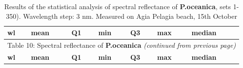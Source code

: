 \documentclass[10pt, a4paper]{article}
\begin{document}
\begin{appendices}
\begin{longtable}{|c|c|c|c|c|c|c|}
	\caption{Results of the statistical analysis of spectral reflectance of \textbf{P.oceanica}, sets 1-350). Wavelength step: 3 nm. Measured on Agia Pelagia beach, 15th October}\label{tab:10} \\
	  \multicolumn{1}{|l|}{\textbf{wl}} &
	   \multicolumn{1}{l|}{\textbf{mean}} & 
	   \multicolumn{1}{l|}{\textbf{Q1}} & 
	   \multicolumn{1}{l|}{\textbf{min}} & 
	   \multicolumn{1}{l|}{\textbf{Q3}} & 
	   \multicolumn{1}{l|}{\textbf{max}} & 
	   \multicolumn{1}{l|}{\textbf{median}} \\ \hline
	\endfirsthead

	\multicolumn{7}{c}{Table 10: Spectral reflectance of \textbf{P.oceanica} \textit{(continued from previous page)}}\\
	\hline \multicolumn{1}{|l|}{\textbf{wl}} & \multicolumn{1}{l|}{\textbf{mean}} & \multicolumn{1}{l|}{\textbf{Q1}} & \multicolumn{1}{l|}{\textbf{min}} & \multicolumn{1}{l|}{\textbf{Q3}} & \multicolumn{1}{l|}{\textbf{max}} & \multicolumn{1}{l|}{\textbf{median}} \\ \hline
	\endhead


\end{longtable}
\end{appendices}
\end{document}
